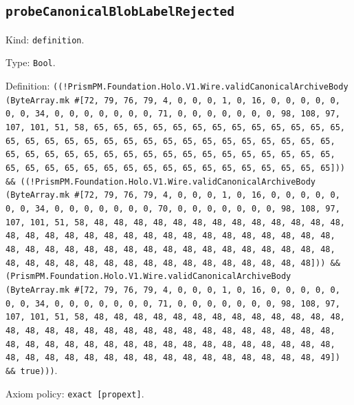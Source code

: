 \documentclass[11pt]{article}
\begin{document}
\subsection*{\texttt{probeCanonicalBlobLabelRejected}}
\noindent Kind: \texttt{definition}.\par
\noindent Type: \texttt{Bool}.\par
\noindent Definition: \texttt{((!PrismPM.Foundation.Holo.V1.Wire.validCanonicalArchiveBody (ByteArray.mk \#[72, 79, 76, 79, 4, 0, 0, 0, 1, 0, 16, 0, 0, 0, 0, 0, 0, 0, 34, 0, 0, 0, 0, 0, 0, 0, 71, 0, 0, 0, 0, 0, 0, 0, 98, 108, 97, 107, 101, 51, 58, 65, 65, 65, 65, 65, 65, 65, 65, 65, 65, 65, 65, 65, 65, 65, 65, 65, 65, 65, 65, 65, 65, 65, 65, 65, 65, 65, 65, 65, 65, 65, 65, 65, 65, 65, 65, 65, 65, 65, 65, 65, 65, 65, 65, 65, 65, 65, 65, 65, 65, 65, 65, 65, 65, 65, 65, 65, 65, 65, 65, 65, 65, 65, 65])) \&\& ((!PrismPM.Foundation.Holo.V1.Wire.validCanonicalArchiveBody (ByteArray.mk \#[72, 79, 76, 79, 4, 0, 0, 0, 1, 0, 16, 0, 0, 0, 0, 0, 0, 0, 34, 0, 0, 0, 0, 0, 0, 0, 70, 0, 0, 0, 0, 0, 0, 0, 98, 108, 97, 107, 101, 51, 58, 48, 48, 48, 48, 48, 48, 48, 48, 48, 48, 48, 48, 48, 48, 48, 48, 48, 48, 48, 48, 48, 48, 48, 48, 48, 48, 48, 48, 48, 48, 48, 48, 48, 48, 48, 48, 48, 48, 48, 48, 48, 48, 48, 48, 48, 48, 48, 48, 48, 48, 48, 48, 48, 48, 48, 48, 48, 48, 48, 48, 48, 48, 48])) \&\& (PrismPM.Foundation.Holo.V1.Wire.validCanonicalArchiveBody (ByteArray.mk \#[72, 79, 76, 79, 4, 0, 0, 0, 1, 0, 16, 0, 0, 0, 0, 0, 0, 0, 34, 0, 0, 0, 0, 0, 0, 0, 71, 0, 0, 0, 0, 0, 0, 0, 98, 108, 97, 107, 101, 51, 58, 48, 48, 48, 48, 48, 48, 48, 48, 48, 48, 48, 48, 48, 48, 48, 48, 48, 48, 48, 48, 48, 48, 48, 48, 48, 48, 48, 48, 48, 48, 48, 48, 48, 48, 48, 48, 48, 48, 48, 48, 48, 48, 48, 48, 48, 48, 48, 48, 48, 48, 48, 48, 48, 48, 48, 48, 48, 48, 48, 48, 48, 48, 48, 49]) \&\& true)))}.\par
\noindent Axiom policy: \texttt{exact [propext]}.\par
\end{document}
